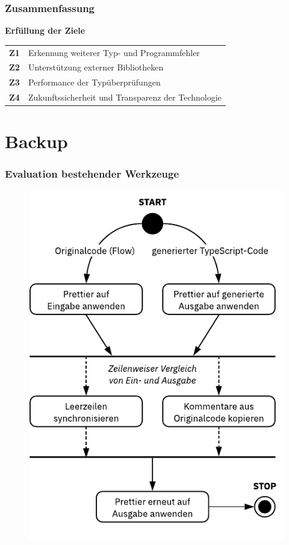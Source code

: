     \begin{frame}
      \frametitle{Zusammenfassung}
      \textbf{Erfüllung der Ziele}\\[1em]
      {
        \renewcommand{\arraystretch}{1.4}
        \begin{tabu} to 
          \textbf{Z1} & Erkennung weiterer Typ- und Programmfehler \\
          \textbf{Z2} & Unterstützung externer Bibliotheken \\
          \textbf{Z3} & Performance der Typüberprüfungen \\
          \textbf{Z4} & Zukunftssicherheit und Transparenz der Technologie \\
        \end{tabu}
      }
    \end{frame}

  \appendix
    \begin{frame}
    \end{frame}

  \section{Backup}

    \begin{frame}[noframenumbering]
      \frametitle{Evaluation bestehender Werkzeuge}
      
    \end{frame}

    \begin{frame}
      \begin{figure}
        \includegraphics[width=.62\textwidth]{src/figures/formatting.pdf}
      \end{figure}
    \end{frame}

